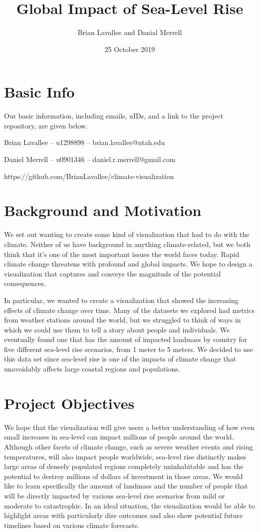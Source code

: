 \documentclass[12pt]{article}
\title{Global Impact of Sea-Level Rise}
\author{Brian Lavallee and Danial Merrell}
\date{25 October 2019}
\begin{document}
	\maketitle

	\section{Basic Info}
		Our basic information, including emails, uIDs, and a link to the project repository, are given below.

		Brian Lavallee -- u1298898 -- brian.lavallee@utah.edu

		Daniel Merrell -- u0901346 -- daniel.r.merrell@gmail.com

		https://github.com/BrianLavallee/climate-visualization

	\section{Background and Motivation}
		We set out wanting to create some kind of visualization that had to do with the climate.
		Neither of us have background in anything climate-related, but we both think that it’s one of the most important issues the world faces today.
		Rapid climate change threatens with profound and global impacts.
		We hope to design a visualization that captures and conveys the magnitude of the potential consequences.

		In particular, we wanted to create a visualization that showed the increasing effects of climate change over time.
		Many of the datasets we explored had metrics from weather stations around the world, but we struggled to think of ways in which we could use them to tell a story about people and individuals.
		We eventually found one that has the amount of impacted landmass by country for five different sea-level rise scenarios, from 1 meter to 5 meters.
		We decided to use this data set since sea-level rise is one of the impacts of climate change that unavoidably affects large coastal regions and populations.

	\section{Project Objectives}
		We hope that the visualization will give users a better understanding of how even small increases in sea-level can impact millions of people around the world.
		Although other facets of climate change, such as severe weather events and rising temperatures, will also impact people worldwide, sea-level rise distinctly makes large areas of densely populated regions completely uninhabitable and has the potential to destroy millions of dollars of investment in those areas.
		We would like to learn specifically the amount of landmass and the number of people that will be directly impacted by various sea-level rise scenarios from mild or moderate to catastrophic.
		In an ideal situation, the visualization would be able to highlight areas with particularly dire outcomes and also show potential future timelines based on various climate forecasts.
\end{document}
